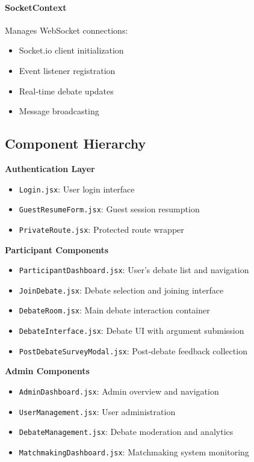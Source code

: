 \paragraph{SocketContext}
Manages WebSocket connections:
\begin{itemize}
    \item Socket.io client initialization
    \item Event listener registration
    \item Real-time debate updates
    \item Message broadcasting
\end{itemize}

\subsection{Component Hierarchy}

\textbf{Authentication Layer}
\begin{itemize}
    \item \texttt{Login.jsx}: User login interface
    \item \texttt{GuestResumeForm.jsx}: Guest session resumption
    \item \texttt{PrivateRoute.jsx}: Protected route wrapper
\end{itemize}

\textbf{Participant Components}
\begin{itemize}
    \item \texttt{ParticipantDashboard.jsx}: User's debate list and navigation
    \item \texttt{JoinDebate.jsx}: Debate selection and joining interface
    \item \texttt{DebateRoom.jsx}: Main debate interaction container
    \item \texttt{DebateInterface.jsx}: Debate UI with argument submission
    \item \texttt{PostDebateSurveyModal.jsx}: Post-debate feedback collection
\end{itemize}

\textbf{Admin Components}
\begin{itemize}
    \item \texttt{AdminDashboard.jsx}: Admin overview and navigation
    \item \texttt{UserManagement.jsx}: User administration
    \item \texttt{DebateManagement.jsx}: Debate moderation and analytics
    \item \texttt{MatchmakingDashboard.jsx}: Matchmaking system monitoring
\end{itemize}

